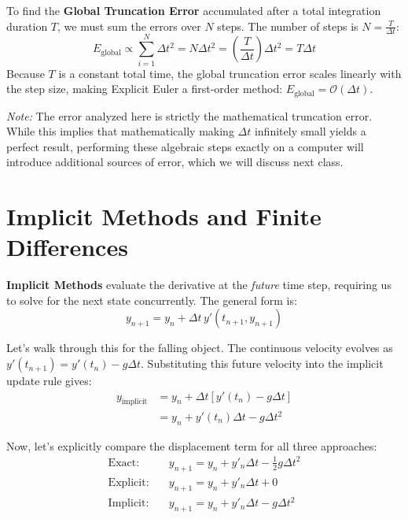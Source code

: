 \documentclass[11pt]{article}
\begin{document}
To find the \textbf{Global Truncation Error} accumulated after a total integration duration $T$, we must sum the errors over $N$ steps. The number of steps is $N = \frac{T}{\Delta t}$:
\begin{equation}
    E_{\text{global}} \propto \sum_{i=1}^N \Delta t^2 = N \Delta t^2 = \left(\frac{T}{\Delta t}\right) \Delta t^2 = T \Delta t
\end{equation}
Because $T$ is a constant total time, the global truncation error scales linearly with the step size, making Explicit Euler a first-order method: $E_{\text{global}} = \mathcal{O}(\Delta t)$.

\textit{Note:} The error analyzed here is strictly the mathematical truncation error. While this implies that mathematically making $\Delta t$ infinitely small yields a perfect result, performing these algebraic steps exactly on a computer will introduce additional sources of error, which we will discuss next class.

\section{Implicit Methods and Finite Differences}

\textbf{Implicit Methods} evaluate the derivative at the \textit{future} time step, requiring us to solve for the next state concurrently. The general form is:
\begin{equation}
    y_{n+1} = y_n + \Delta t \, y'(t_{n+1}, y_{n+1})
\end{equation}

Let's walk through this for the falling object. The continuous velocity evolves as $y'(t_{n+1}) = y'(t_n) - g\Delta t$. Substituting this future velocity into the implicit update rule gives:
\begin{align}
    y_{\text{implicit}} &= y_n + \Delta t \left[ y'(t_n) - g\Delta t \right] \\
    &= y_n + y'(t_n)\Delta t - g\Delta t^2
\end{align}

Now, let's explicitly compare the displacement term for all three approaches:
\begin{align*}
    \text{Exact:} \quad & y_{n+1} = y_n + y'_n\Delta t - \frac{1}{2}g\Delta t^2 \\
    \text{Explicit:} \quad & y_{n+1} = y_n + y'_n\Delta t + 0 \\
    \text{Implicit:} \quad & y_{n+1} = y_n + y'_n\Delta t - g\Delta t^2
\end{align*}
\end{document}
